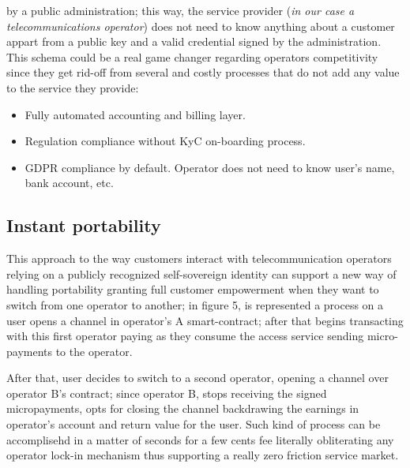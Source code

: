 \documentclass[12pt]{amsart}
\begin{document}
\begin{multicols}{2}
by a public administration; this way, the service provider (\textit{in
  our case a telecommunications operator}) does not need to know
anything about a customer appart from a public key and a valid
credential signed by the administration. This schema could be a real game
changer regarding operators competitivity since they get rid-off
from several and costly processes that do not add any value to the service
they provide:

\begin{itemize}
\item Fully automated accounting and billing layer.
\item Regulation compliance without KyC on-boarding process.
\item GDPR compliance by default. Operator does not need to know
  user's name, bank account, etc.
\end{itemize}

\subsection{Instant portability}

\vspace{0.35cm}

This approach to the way customers interact with telecommunication
operators relying on a publicly recognized self-sovereign identity
can support a new way of handling portability granting full customer
empowerment when they want to switch from one operator to another;
in figure 5, is represented a process on a user opens a channel
in operator's A smart-contract; after that begins transacting with
this first operator paying as they consume the access service
sending micro-payments to the operator.

\vspace{0.35cm}

After that, user decides to switch to a second operator, opening a channel
over operator B's contract; since operator B, stops receiving the signed
micropayments, opts for closing the channel backdrawing the earnings in operator's
account and return value for the user. Such kind of process can be accomplisehd
in a matter of seconds for a few cents fee literally obliterating any
operator lock-in mechanism thus supporting a really zero friction service market.

\end{multicols}
\end{document}
